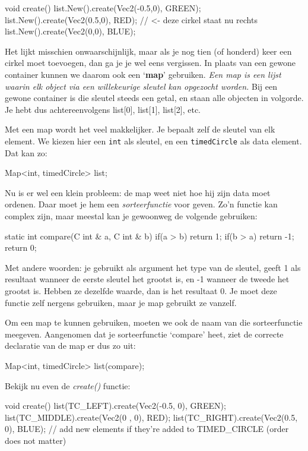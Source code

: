 \begin{code}
  void create() {
    list.New().create(Vec2(-0.5,0), GREEN);
    list.New().create(Vec2(0.5,0), RED); // <- deze cirkel staat nu rechts
    list.New().create(Vec2(0,0), BLUE);
  }
\end{code}

Het lijkt misschien onwaarschijnlijk, maar als je nog tien (of honderd) keer een cirkel moet toevoegen, dan ga je je wel eens vergissen. In plaats van een gewone container kunnen we daarom ook een `\textbf{map}' gebruiken. \textsl{Een map is een lijst waarin elk object via een willekeurige sleutel kan opgezocht worden.} Bij een gewone container is die sleutel steeds een getal, en staan alle objecten in volgorde. Je hebt dus achtereenvolgens list[0], list[1], list[2], etc.

Met een map wordt het veel makkelijker. Je bepaalt zelf de sleutel van elk element. We kiezen hier een \texttt{int} als sleutel, en een \texttt{timedCircle} als data element. Dat kan zo:

\begin{code}
Map<int, timedCircle> list;
\end{code}

Nu is er wel een klein probleem: de map weet niet hoe hij zijn data moet ordenen. Daar moet je hem een \textsl{sorteerfunctie} voor geven. Zo'n functie kan complex zijn, maar meestal kan je gewoonweg de volgende gebruiken:

\begin{code}
static int compare(C int & a, C int & b)
{
	if(a > b) return 1;
	if(b > a) return -1;
	return 0;
}
\end{code}

Met andere woorden: je gebruikt als argument het type van de sleutel, geeft 1 als resultaat wanneer de eerste sleutel het grootst is, en -1 wanneer de tweede het grootst is. Hebben ze dezelfde waarde, dan is het resultaat 0. Je moet deze functie zelf nergens gebruiken, maar je map gebruikt ze vanzelf.

Om een map te kunnen gebruiken, moeten we ook de naam van die sorteerfunctie meegeven. Aangenomen dat je sorteerfunctie `compare' heet, ziet de correcte declaratie van de map er dus zo uit:

\begin{code}
Map<int, timedCircle> list(compare);
\end{code}

Bekijk nu even de \textsl{create()} functie:

\begin{code}
void create() {
	list(TC_LEFT).create(Vec2(-0.5, 0), GREEN);
	list(TC_MIDDLE).create(Vec2(0 , 0), RED);
	list(TC_RIGHT).create(Vec2(0.5, 0), BLUE);
	// add new elements if they're added to TIMED_CIRCLE (order does not matter)
}
\end{code}


